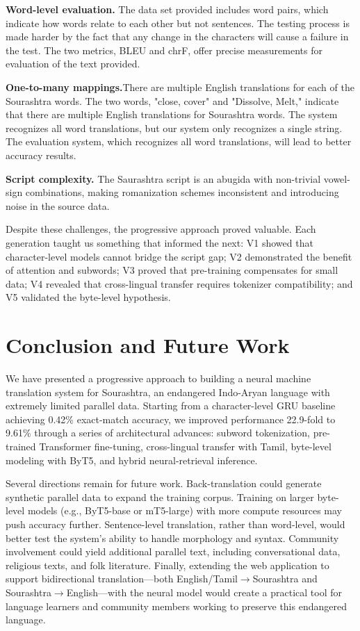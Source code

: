 \documentclass[conference]{IEEEtran}
\begin{document}
\textbf{Word-level evaluation.} The data set provided includes word pairs, which indicate how words relate to each other but not sentences. The testing process is made harder by the fact that any change in the characters will cause a failure in the test. The two metrics, BLEU and chrF, offer precise measurements for evaluation of the text provided.

\textbf{One-to-many mappings.}There are multiple English translations for each of the Sourashtra words. The two words, "close, cover" and "Dissolve, Melt," indicate that there are multiple English translations for Sourashtra words. The system recognizes all word translations, but our system only recognizes a single string. The evaluation system, which recognizes all word translations, will lead to better accuracy results.

\textbf{Script complexity.} The Saurashtra script is an abugida with non-trivial vowel-sign combinations, making romanization schemes inconsistent and introducing noise in the source data.

Despite these challenges, the progressive approach proved valuable. Each generation taught us something that informed the next: V1 showed that character-level models cannot bridge the script gap; V2 demonstrated the benefit of attention and subwords; V3 proved that pre-training compensates for small data; V4 revealed that cross-lingual transfer requires tokenizer compatibility; and V5 validated the byte-level hypothesis.

\section{Conclusion and Future Work}\label{sec:conclusion}

We have presented a progressive approach to building a neural machine translation system for Sourashtra, an endangered Indo-Aryan language with extremely limited parallel data. Starting from a character-level GRU baseline achieving 0.42\% exact-match accuracy, we improved performance 22.9-fold to 9.61\% through a series of architectural advances: subword tokenization, pre-trained Transformer fine-tuning, cross-lingual transfer with Tamil, byte-level modeling with ByT5, and hybrid neural-retrieval inference.

Several directions remain for future work. Back-translation could generate synthetic parallel data to expand the training corpus. Training on larger byte-level models (e.g., ByT5-base or mT5-large) with more compute resources may push accuracy further. Sentence-level translation, rather than word-level, would better test the system's ability to handle morphology and syntax. Community involvement could yield additional parallel text, including conversational data, religious texts, and folk literature. Finally, extending the web application to support bidirectional translation---both English/Tamil$\rightarrow$Sourashtra and Sourashtra$\rightarrow$English---with the neural model would create a practical tool for language learners and community members working to preserve this endangered language.
\end{document}

